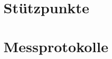\clearpage
\section{St\"utzpunkte}
\begin{figure}[h!]
    \resizebox{\textwidth}{!}{}
\end{figure}

\section{Messprotokolle}

